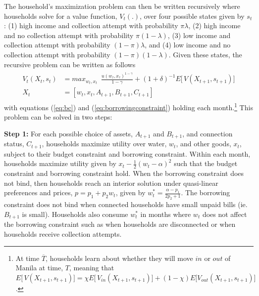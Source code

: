 \documentclass[12pt]{article}
\begin{document}
The household's maximization problem can then be written recursively where households solve for a value function, $V_t(.)$, over four possible states given by $s_{t}$: (1) high income and collection attempt with probability $\pi\lambda$, (2) high income and no collection attempt with probability $\pi(1-\lambda)$, (3) low income and collection attempt with probability $(1-\pi)\lambda$, and (4) low income and no collection attempt with probability $(1-\pi)(1-\lambda)$.  Given these states, the recursive problem can be written as follows
\begin{align}
\label{eq:valmax}
\begin{split}
V_t(X_{t},s_t) &= max_{w_t,x_{t}} \,\,\, \frac{u(w_{\tau},x_{\tau})^{1-\gamma}}{1-\gamma}   + (1+\delta)^{-1}  E \Big[\, V(X_{t+1},s_{t+1})\Big] \\
X_t &= [w_t,x_t,A_{t+1},B_{t+1},C_{t+1}] 
\end{split}
\end{align}
with equations (\ref{eq:bc}) and (\ref{eq:borrowingconstraint}) holding each month.\footnote{At time $\overline{T}$, households learn about whether they will move $in$ or $out$ of Manila at time, $T$, meaning that $E \Big[\, V(X_{t+1},s_{t+1})\Big] =  \chi E \Big[\,V_{in}(X_{t+1},s_{t+1})\Big] + (1-\chi) E\Big[V_{out}(X_{t+1},s_{t+1})\Big]$.}  This problem can be solved in two steps: %


\textbf{Step 1:} For each possible choice of assets, $A_{t+1}$ and $B_{t+1}$, and connection status, $C_{t+1}$, households maximize utility over water, $w_t$, and other goods, $x_t$, subject to their budget constraint and borrowing constraint.  Within each month, households maximize utility given by $ x_t -  \frac{1}{2} (w_t - \alpha)^2 $ such that the budget constraint and borrowing constraint hold.  When the borrowing constraint does not bind, then households reach an interior solution under quasi-linear preferences and prices, $p=p_1+p_2w_t$, given by $w_t^{*} =  \frac{ \alpha - p_1}{2p_2 + 1}$.  The borrowing constraint does not bind when connected households have small unpaid bills (ie. $B_{t+1}$ is small).  Households also consume $w_t^{*}$ in months where $w_t$ does not affect the borrowing constraint such as when households are disconnected or when households receive collection attempts.
\end{document}
